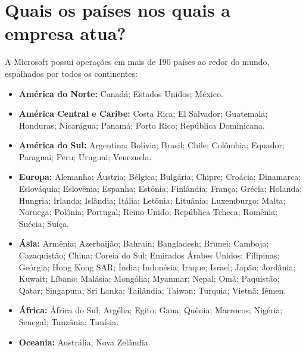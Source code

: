 \section{Quais os países nos quais a empresa atua?}

A Microsoft possui operações em mais de 190 países ao redor do mundo, espalhados por todos os continentes:

\begin{itemize}
    \item \textbf{América do Norte:} Canadá; Estados Unidos; México.

    \item \textbf{América Central e Caribe:} Costa Rica; El Salvador; Guatemala; Honduras; Nicarágua; Panamá; Porto Rico; República Dominicana.

    \item \textbf{América do Sul:} Argentina; Bolívia; Brasil; Chile; Colômbia; Equador; Paraguai; Peru; Uruguai; Venezuela.

    \item \textbf{Europa:} Alemanha; Áustria; Bélgica; Bulgária; Chipre; Croácia; Dinamarca; Eslováquia; Eslovênia; Espanha; Estônia; Finlândia; França; Grécia; Holanda; Hungria; Irlanda; Islândia; Itália; Letônia; Lituânia; Luxemburgo; Malta; Noruega; Polônia; Portugal; Reino Unido; República Tcheca; Romênia; Suécia; Suíça.

    \item \textbf{Ásia:} Armênia; Azerbaijão; Bahrain; Bangladesh; Brunei; Camboja; Cazaquistão; China; Coreia do Sul; Emirados Árabes Unidos; Filipinas; Geórgia; Hong Kong SAR; Índia; Indonésia; Iraque; Israel; Japão; Jordânia; Kuwait; Líbano; Malásia; Mongólia; Myanmar; Nepal; Omã; Paquistão; Qatar; Singapura; Sri Lanka; Tailândia; Taiwan; Turquia; Vietnã; Iêmen.

    \item \textbf{África:} África do Sul; Argélia; Egito; Gana; Quênia; Marrocos; Nigéria; Senegal; Tanzânia; Tunísia.

    \item \textbf{Oceania:} Austrália; Nova Zelândia.
\end{itemize}
